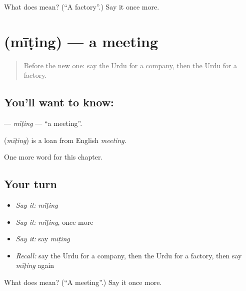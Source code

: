 \begin{tcolorbox}[breakable,colback=teal!4,colframe=teal!35!black,title={Before you move on}]
What does  mean? (\textquotedblleft{}A factory\textquotedblright{}.) Say it once more.
\end{tcolorbox}
\section[\texorpdfstring{\ur{میٹنگ} (mīṭing)}{میٹنگ (mīṭing)}]{ (mīṭing) — a meeting}

\label{lesson:UR-C261-miting}



\begin{quote}
Before the new one: say the Urdu for a company, then the Urdu for a factory.
\end{quote}

\subsection*{You'll want to know: }
\textbf{} — \emph{mīṭing} — \textquotedblleft{}a meeting\textquotedblright{}.

\begin{cousinweb}
\textbf{} (\emph{mīṭing}) is a loan from English \emph{meeting}.
\end{cousinweb}

\begin{grammarlens}[title={What you've built}]
One more word for this chapter.
\end{grammarlens}

\subsection*{Your turn}
\begin{itemize}
\raggedright
  \item \emph{Say it:} \emph{mīṭing}
  \item \emph{Say it:} \emph{mīṭing}, once more
  \item \emph{Say it:} say \emph{mīṭing}
  \item \emph{Recall:} say the Urdu for a company, then the Urdu for a factory, then say \emph{mīṭing} again
\end{itemize}

\begin{tcolorbox}[breakable,colback=teal!4,colframe=teal!35!black,title={Before you move on}]
What does  mean? (\textquotedblleft{}A meeting\textquotedblright{}.) Say it once more.
\end{tcolorbox}

